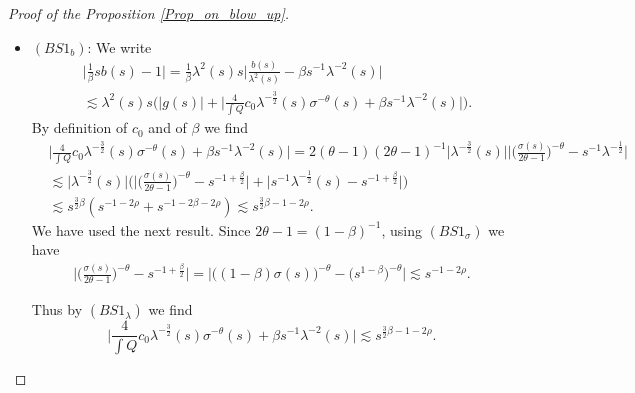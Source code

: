 \documentclass[10pt,a4paper]{amsart}
\begin{document}
\begin{proof}[Proof of the Proposition \ref{Prop_on_blow_up}]
\begin{itemize}
\item $(BS1_b)$: We write
\begin{equation}
    \begin{split}
        &\Big\lvert \frac{1}{\beta}sb(s) -1 \Big\rvert = \frac{1}{\beta}\lambda^2(s)s \Big\lvert \frac{b(s)}{\lambda^2(s)} - \beta s^{-1}\lambda^{-2}(s)\Big\rvert \\
        &\lesssim \lambda^2(s)s \Bigg( \lvert g(s) \rvert + \Big\lvert \frac{4}{\int Q}c_0 \lambda^{-\frac{3}{2}}(s)\sigma^{-\theta}(s) + \beta s^{-1}\lambda^{-2}(s) \Big\rvert \Bigg) .
    \end{split}
\end{equation}
 By definition of $c_0$ and of $\beta$ we find
 \begin{equation}
 \begin{split}
     &\Big\lvert \frac{4}{\int Q}c_0 \lambda^{-\frac{3}{2}}(s)\sigma^{-\theta}(s) + \beta s^{-1}\lambda^{-2}(s) \Big\rvert  = 2(\theta-1)(2\theta-1)^{-1}\lvert \lambda^{-\frac{3}{2}}(s)\rvert \Bigg\lvert \Big( \frac{\sigma(s)}{2\theta-1} \Big)^{-\theta} - s^{-1}\lambda^{-\frac{1}{2}} \Bigg\rvert\\
     &\lesssim  \lvert \lambda^{-\frac{3}{2}}(s)\rvert \Bigg( \Big\lvert \Big( \frac{\sigma(s)}{2\theta-1} \Big)^{-\theta} - s^{-1+\frac{\beta}{2}} \Big\rvert +  \lvert s^{-1}\lambda^{-\frac{1}{2}}(s)- s^{-1+\frac{\beta}{2}} \rvert \Bigg)\\
     &\lesssim s^{\frac{3}{2}\beta}(s^{-1-2\rho}+ s^{-1-2\beta-2\rho}) \lesssim s^{\frac{3}{2}\beta-1-2\rho}.
\end{split}
 \end{equation}
We have used the next result. Since $2\theta-1 = (1-\beta)^{-1}$, using $(BS1_{\sigma})$ we have
 \begin{equation}
 \begin{split}
     \Bigg\lvert \Big( \frac{\sigma(s)}{2\theta-1} \Big)^{-\theta} - s^{-1+\frac{\beta}{2}} \Bigg\rvert = \Big\lvert \Big( (1-\beta)\sigma(s) \Big)^{-\theta} - \Big(s^{1-\beta}\Big)^{-\theta}\Big\rvert \lesssim s^{-1-2\rho}.
    \end{split}
 \end{equation}
 
Thus by $(BS1_\lambda)$ we find
\begin{equation}
    \Big\lvert \frac{4}{\int Q}c_0 \lambda^{-\frac{3}{2}}(s)\sigma^{-\theta}(s) + \beta s^{-1}\lambda^{-2}(s) \Big\rvert \lesssim s^{\frac{3}{2}\beta-1-2\rho}.
\end{equation}


\end{itemize}
\end{proof}
\end{document}
